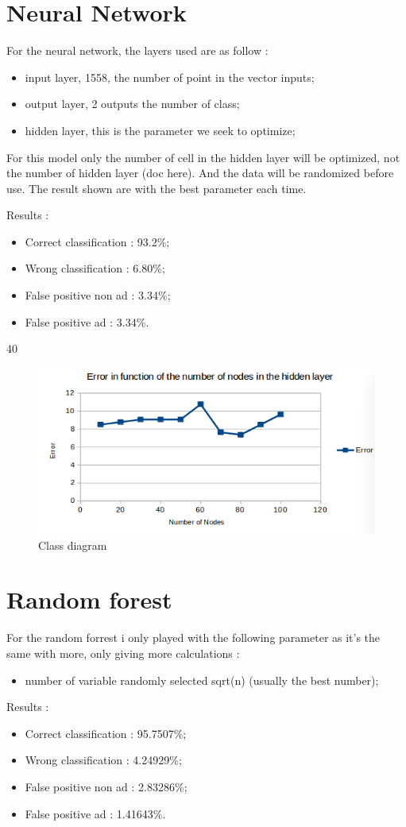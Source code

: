 \section{Neural Network}
For the neural network, the layers used are as follow :
  \begin{itemize}
    \item input layer, 1558, the number of point in the vector inputs;
    \item output layer, 2 outputs the number of class;
    \item hidden layer, this is the parameter we seek to optimize;
  \end{itemize}

 For this model only the number of cell in the hidden layer will be optimized, not the number of hidden layer (doc here). And the data will be randomized before use. The result shown are with the best parameter each time.

  Results :
  \begin{itemize}
    \item Correct classification : 93.2\%;
    \item Wrong classification : 6.80\%;
    \item False positive non ad : 3.34\%;
    \item False positive ad : 3.34\%.
  \end{itemize}

40
  \begin{figure}[h]
   \centering
   \includegraphics[scale=0.5]{../images/NNPO.png}
   \caption{Class diagram}
  \end{figure}

\section{Random forest}
For the random forrest i only played with the following parameter as it's the same with more, only giving more calculations :
  \begin{itemize}
    \item number of variable randomly selected sqrt(n) (usually the best number);
  \end{itemize}
Results :
\begin{itemize}
  \item Correct classification : 95.7507\%;
  \item Wrong classification : 4.24929\%;
  \item False positive non ad : 2.83286\%;
  \item False positive ad : 1.41643\%.
\end{itemize}


